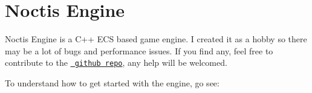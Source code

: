 \chapter{Noctis Engine}
\hypertarget{index}{}\label{index}
\label{index_noctis_engine}%
%
 Noctis Engine is a C++ ECS based game engine. I created it as a hobby so there may be a lot of bugs and performance issues. If you find any, feel free to contribute to the \href{https://github.com/TeddouX/noctis-engine}{\texttt{ github repo}}, any help will be welcomed.

To understand how to get started with the engine, go see\+:  
